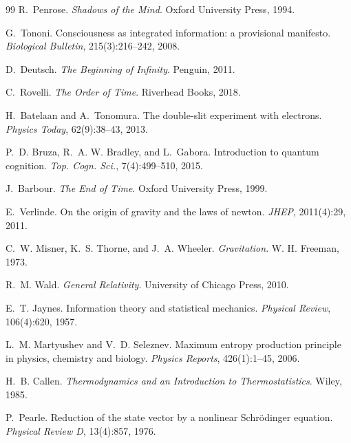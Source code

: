 \documentclass[12pt]{article}
\begin{document}

\begin{thebibliography}{99}
R.~Penrose.
\newblock \emph{Shadows of the Mind}.
\newblock Oxford University Press, 1994.

G.~Tononi.
\newblock Consciousness as integrated information: a provisional manifesto.
\newblock \emph{Biological Bulletin}, 215(3):216--242, 2008.

D.~Deutsch.
\newblock \emph{The Beginning of Infinity}.
\newblock Penguin, 2011.

C.~Rovelli.
\newblock \emph{The Order of Time}.
\newblock Riverhead Books, 2018.

H.~Batelaan and A.~Tonomura.
\newblock The double-slit experiment with electrons.
\newblock \emph{Physics Today}, 62(9):38--43, 2013.

P.~D. Bruza, R.~A. W. Bradley, and L.~Gabora.
\newblock Introduction to quantum cognition.
\newblock \emph{Top. Cogn. Sci.}, 7(4):499--510, 2015.

J.~Barbour.
\newblock \emph{The End of Time}.
\newblock Oxford University Press, 1999.

E.~Verlinde.
\newblock On the origin of gravity and the laws of newton.
\newblock \emph{JHEP}, 2011(4):29, 2011.

C.~W. Misner, K.~S. Thorne, and J.~A. Wheeler.
\newblock \emph{Gravitation}.
\newblock W. H. Freeman, 1973.

R.~M. Wald.
\newblock \emph{General Relativity}.
\newblock University of Chicago Press, 2010.

E.~T. Jaynes.
\newblock Information theory and statistical mechanics.
\newblock \emph{Physical Review}, 106(4):620, 1957.

L.~M. Martyushev and V.~D. Seleznev.
\newblock Maximum entropy production principle in physics, chemistry and biology.
\newblock \emph{Physics Reports}, 426(1):1--45, 2006.

H.~B. Callen.
\newblock \emph{Thermodynamics and an Introduction to Thermostatistics}.
\newblock Wiley, 1985.

P.~Pearle.
\newblock Reduction of the state vector by a nonlinear Schr{\"o}dinger equation.
\newblock \emph{Physical Review D}, 13(4):857, 1976.


\end{thebibliography}
\end{document}
